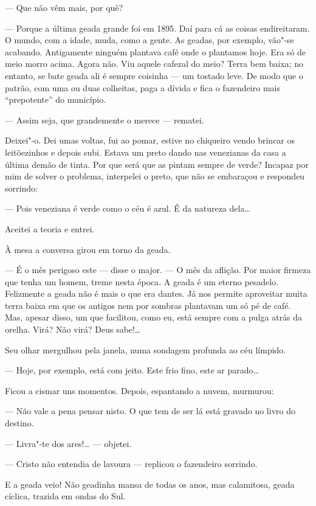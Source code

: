 --- Que não vêm mais, por quê?

--- Porque a última geada grande foi em 1895. Daí para cá as coisas
endireitaram. O mundo, com a idade, muda, como a gente. As geadas, por
exemplo, vão"-se acabando. Antigamente ninguém plantava café onde o
plantamos hoje. Era só de meio morro acima. Agora não. Viu aquele
cafezal do meio? Terra bem baixa; no entanto, se bate geada ali é sempre
coisinha --- um tostado leve. De modo que o patrão, com uma ou duas
colheitas, paga a dívida e fica o fazendeiro mais ``prepotente'' do
município.

--- Assim seja, que grandemente o merece --- rematei.

Deixei"-o. Dei umas voltas, fui ao pomar, estive no chiqueiro vendo
brincar os leitõezinhos e depois subi. Estava um preto dando nas
venezianas da casa a última demão de tinta. Por que será que as pintam
sempre de verde? Incapaz por mim de solver o problema, interpelei o
preto, que não se embaraçou e respondeu sorrindo:

--- Pois veneziana é verde como o céu é azul. É da natureza dela\ldots{}

Aceitei a teoria e entrei.

À mesa a conversa girou em torno da geada.

--- É o mês perigoso este --- disse o major. --- O mês da aflição. Por
maior firmeza que tenha um homem, treme nesta época. A geada é um eterno
pesadelo. Felizmente a geada não é mais o que era dantes. Já nos permite
aproveitar muita terra baixa em que os antigos nem por sombras plantavam
um só pé de café. Mas, apesar disso, um que facilitou, como eu, está
sempre com a pulga atrás da orelha. Virá? Não virá? Deus sabe!\ldots{}

Seu olhar mergulhou pela janela, numa sondagem profunda ao céu límpido.

--- Hoje, por exemplo, está com jeito. Este frio fino, este ar parado\ldots{}

Ficou a cismar uns momentos. Depois, espantando a nuvem, murmurou:

--- Não vale a pena pensar nisto. O que tem de ser lá está gravado no
livro do destino.

--- Livra"-te dos ares!\ldots{} --- objetei.

--- Cristo não entendia de lavoura --- replicou o fazendeiro sorrindo.

E a geada veio! Não geadinha mansa de todas os anos, mas calamitosa,
geada cíclica, trazida em ondas do Sul.

